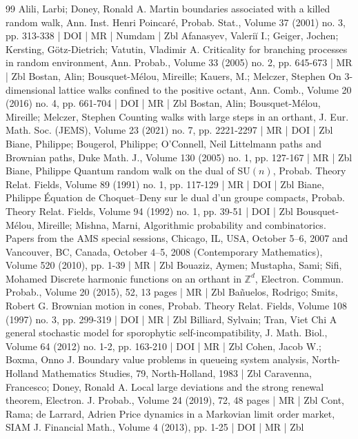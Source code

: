 \begin{thebibliography}{99}
Alili, Larbi; Doney, Ronald A. Martin boundaries associated with a killed random walk, Ann. Inst. Henri Poincaré, Probab. Stat., Volume 37 (2001) no. 3, pp. 313-338 | DOI | MR | Numdam | Zbl
Afanasyev, Valeriĭ I.; Geiger, Jochen; Kersting, Götz-Dietrich; Vatutin, Vladimir A. Criticality for branching processes in random environment, Ann. Probab., Volume 33 (2005) no. 2, pp. 645-673 | MR | Zbl
Bostan, Alin; Bousquet-Mélou, Mireille; Kauers, M.; Melczer, Stephen On $3$-dimensional lattice walks confined to the positive octant, Ann. Comb., Volume 20 (2016) no. 4, pp. 661-704 | DOI | MR | Zbl
Bostan, Alin; Bousquet-Mélou, Mireille; Melczer, Stephen Counting walks with large steps in an orthant, J. Eur. Math. Soc. (JEMS), Volume 23 (2021) no. 7, pp. 2221-2297 | MR | DOI | Zbl
Biane, Philippe; Bougerol, Philippe; O’Connell, Neil Littelmann paths and Brownian paths, Duke Math. J., Volume 130 (2005) no. 1, pp. 127-167 | MR | Zbl
Biane, Philippe Quantum random walk on the dual of SU$(n)$, Probab. Theory Relat. Fields, Volume 89 (1991) no. 1, pp. 117-129 | MR | DOI | Zbl
Biane, Philippe Équation de Choquet–Deny sur le dual d’un groupe compacts, Probab. Theory Relat. Fields, Volume 94 (1992) no. 1, pp. 39-51 | DOI | Zbl
Bousquet-Mélou, Mireille; Mishna, Marni, Algorithmic probability and combinatorics. Papers from the AMS special sessions, Chicago, IL, USA, October 5–6, 2007 and Vancouver, BC, Canada, October 4–5, 2008 (Contemporary Mathematics), Volume 520 (2010), pp. 1-39 | MR | Zbl
Bouaziz, Aymen; Mustapha, Sami; Sifi, Mohamed Discrete harmonic functions on an orthant in $\mathbb{Z}^d$, Electron. Commun. Probab., Volume 20 (2015), 52, 13 pages | MR | Zbl
Bañuelos, Rodrigo; Smits, Robert G. Brownian motion in cones, Probab. Theory Relat. Fields, Volume 108 (1997) no. 3, pp. 299-319 | DOI | MR | Zbl
Billiard, Sylvain; Tran, Viet Chi A general stochastic model for sporophytic self-incompatibility, J. Math. Biol., Volume 64 (2012) no. 1-2, pp. 163-210 | DOI | MR | Zbl
Cohen, Jacob W.; Boxma, Onno J. Boundary value problems in queueing system analysis, North-Holland Mathematics Studies, 79, North-Holland, 1983 | Zbl
Caravenna, Francesco; Doney, Ronald A. Local large deviations and the strong renewal theorem, Electron. J. Probab., Volume 24 (2019), 72, 48 pages | MR | Zbl
Cont, Rama; de Larrard, Adrien Price dynamics in a Markovian limit order market, SIAM J. Financial Math., Volume 4 (2013), pp. 1-25 | DOI | MR | Zbl

\end{thebibliography}
